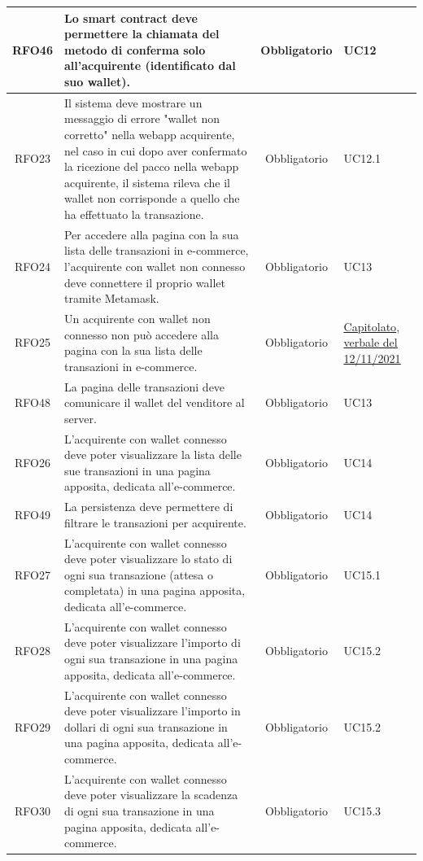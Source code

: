 \documentclass[a4paper, 12pt]{article}
\begin{document}
\begin{longtable}{|c|p{7cm}|c|p{4cm}|}
\hline
RFO46 & Lo smart contract deve permettere la chiamata del metodo di conferma solo all'acquirente (identificato dal suo wallet). & Obbligatorio & UC12 \\
\hline
RFO23 & Il sistema deve mostrare un messaggio di errore "wallet non corretto" nella webapp acquirente, nel caso in cui dopo aver confermato la ricezione del pacco nella webapp acquirente, il sistema rileva che il wallet non corrisponde a quello che ha effettuato la transazione. & Obbligatorio & UC12.1 \\
\hline
RFO24 & Per accedere alla pagina con la sua lista delle transazioni in e-commerce, l'acquirente con wallet non connesso deve connettere il proprio wallet tramite Metamask. & Obbligatorio & UC13 \\
\hline
RFO25 & Un acquirente con wallet non connesso non può accedere alla pagina con la sua lista delle transazioni in e-commerce. & Obbligatorio & \underline{\href{https://www.math.unipd.it/~tullio/IS-1/2021/Progetto/C2.pdf}{Capitolato}}, \underline{\href{https://github.com/iota97/WinningSoftwareSolution/blob/main/docs/interni/verbali/2021_11_12_E/2021_11_12_E.pdf}{verbale del 12/11/2021}} \\
\hline
RFO48 & La pagina delle transazioni deve comunicare il wallet del venditore al server. & Obbligatorio & UC13\\
\hline
RFO26 & L'acquirente con wallet connesso deve poter visualizzare la lista delle sue transazioni in una pagina apposita, dedicata all'e-commerce. & Obbligatorio & UC14 \\
\hline
RFO49 & La persistenza deve permettere di filtrare le transazioni per acquirente. & Obbligatorio & UC14 \\
\hline
RFO27 & L'acquirente con wallet connesso deve poter visualizzare lo stato di ogni sua transazione (attesa o completata) in una pagina apposita, dedicata all'e-commerce. & Obbligatorio & UC15.1 \\
\hline
RFO28 & L'acquirente con wallet connesso deve poter visualizzare l'importo di ogni sua transazione in una pagina apposita, dedicata all'e-commerce. & Obbligatorio & UC15.2 \\
\hline
RFO29 & L'acquirente con wallet connesso deve poter visualizzare l'importo in dollari di ogni sua transazione in una pagina apposita, dedicata all'e-commerce. & Obbligatorio & UC15.2 \\
\hline
RFO30 & L'acquirente con wallet connesso deve poter visualizzare la scadenza di ogni sua transazione in una pagina apposita, dedicata all'e-commerce. & Obbligatorio & UC15.3 \\

\end{longtable}
\end{document}

